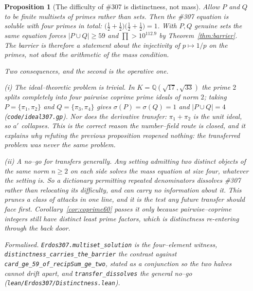 \documentclass[11pt]{article}
\newtheorem{proposition}[theorem]{Proposition}
\theoremstyle{definition}
\begin{document}
\begin{proposition}[The difficulty of \#307 is distinctness, not mass]\label{prop:distinct}
Allow $P$ and $Q$ to be finite \emph{multisets} of primes rather than sets. Then the \#307 equation
is soluble with four primes in total:
$\bigl(\tfrac12+\tfrac12\bigr)\bigl(\tfrac12+\tfrac12\bigr)=1$. With $P,Q$ genuine sets the same
equation forces $|P\cup Q|\ge59$ and $\prod>10^{112.9}$ by Theorem~\ref{thm:barrier}. The barrier is
therefore a statement about the injectivity of $p\mapsto1/p$ on the primes, not about the arithmetic
of the mass condition.

Two consequences, and the second is the operative one.

\textup{(i)} \emph{The ideal--theoretic problem is trivial.} In $K=\mathbb{Q}(\sqrt{17},\sqrt{33})$
the prime $2$ splits completely into four pairwise coprime prime ideals of norm $2$; taking
$P=\{\pi_1,\pi_2\}$ and $Q=\{\pi_3,\pi_4\}$ gives $\sigma(P)=\sigma(Q)=1$ and $|P\cup Q|=4$
\textup{(\texttt{code/ideal307.gp})}. Nor does the derivative transfer: $\pi_1+\pi_2$ is the unit
ideal, so $a'$ collapses. This is the correct reason the number--field route is closed, and it
explains why refuting the previous proposition reopened nothing: the transferred problem was never
the same problem.

\textup{(ii)} \emph{A no--go for transfers generally.} Any setting admitting two distinct objects of
the same norm $n\ge2$ on each side solves the mass equation at size four, whatever the setting is.
So a dictionary permitting repeated denominators \emph{dissolves} \#307 rather than relocating its
difficulty, and can carry no information about it. This prunes a class of attacks in one line, and
it is the test any future transfer should face first. Corollary~\ref{cor:coprime60} passes it only
because pairwise--coprime integers still have distinct least prime factors, which is distinctness
re-entering through the back door.

\textup{Formalised.} \texttt{Erdos307.multiset\_solution} is the four--element witness,
\texttt{distinctness\_carries\_the\_barrier} the contrast against
\texttt{card\_ge\_59\_of\_recipSum\_ge\_two}, stated as a conjunction so the two halves cannot drift
apart, and \texttt{transfer\_dissolves} the general no--go
\textup{(\texttt{lean/Erdos307/Distinctness.lean})}.
\end{proposition}
\end{document}
